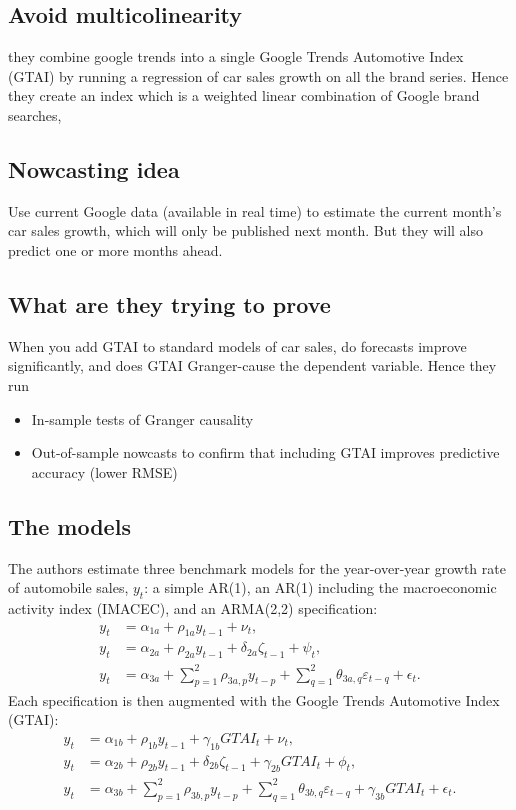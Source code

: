 \documentclass{article}
\begin{document}
\subsection{Avoid multicolinearity}
they combine google trends into a single Google Trends Automotive Index (GTAI) by running a regression of car sales growth on all the brand series. Hence they create an index which is a  weighted linear combination of Google brand searches,

\subsection{Nowcasting idea}
Use current Google data (available in real time) to estimate the current month’s car sales growth, which will only be published next month. But they will also predict one or more months ahead.


\subsection{What are they trying to prove}
When you add GTAI to standard models of car sales, do forecasts improve significantly, and does GTAI Granger-cause the dependent variable.
Hence they run
\begin{itemize}
    \item In-sample tests of Granger causality
    \item Out-of-sample nowcasts to confirm that including GTAI improves predictive accuracy (lower RMSE)
\end{itemize}

\subsection{The models}
The authors estimate three benchmark models for the year-over-year
growth rate of automobile sales, $y_t$: a simple AR(1), an AR(1)
including the macroeconomic activity index (IMACEC), and an ARMA(2,2)
specification:
\begin{align}
y_t &= \alpha_{1a} + \rho_{1a} y_{t-1} + \nu_t, \\
y_t &= \alpha_{2a} + \rho_{2a} y_{t-1} + \delta_{2a}\zeta_{t-1} + \psi_t, \\
y_t &= \alpha_{3a} + \sum_{p=1}^{2}\rho_{3a,p} y_{t-p}
      + \sum_{q=1}^{2}\theta_{3a,q}\varepsilon_{t-q} + \epsilon_t .
\end{align}
Each specification is then augmented with the Google Trends Automotive
Index (GTAI):
\begin{align}
y_t &= \alpha_{1b} + \rho_{1b} y_{t-1} + \gamma_{1b}GTAI_t + \nu_t, \\
y_t &= \alpha_{2b} + \rho_{2b} y_{t-1} + \delta_{2b}\zeta_{t-1}
      + \gamma_{2b}GTAI_t + \phi_t, \\
y_t &= \alpha_{3b} + \sum_{p=1}^{2}\rho_{3b,p} y_{t-p}
      + \sum_{q=1}^{2}\theta_{3b,q}\varepsilon_{t-q}
      + \gamma_{3b}GTAI_t + \epsilon_t .
\end{align}
\end{document}
